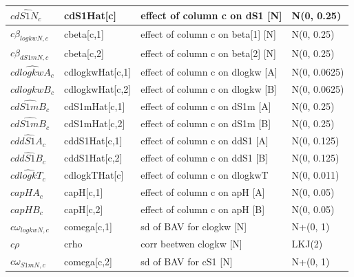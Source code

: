 \documentclass[
]{article}
\begin{document}
\begin{longtable*}[t]{l|l|>{\raggedright\arraybackslash}p{5cm}|l}
\hline
\hspace{1em}$\widehat{cdS1N_c}$ & cdS1Hat[c] & effect of column c on dS1 [N] & N(0, 0.25)\\
\hline
\hspace{1em}$c\beta_{logkwN,c}$ & cbeta[c,1] & effect of column c on beta[1] [N] & N(0, 0.25)\\
\hline
\hspace{1em}$c\beta_{dS1mN,c}$ & cbeta[c,2] & effect of column c on beta[2] [N] & N(0, 0.25)\\
\hline
\hspace{1em}$\widehat{cdlogkwA_{c}}$ & cdlogkwHat[c,1] & effect of column c on dlogkw [A] & N(0, 0.0625)\\
\hline
\hspace{1em}$\widehat{cdlogkwB_{c}}$ & cdlogkwHat[c,2] & effect of column c on dlogkw [B] & N(0, 0.0625)\\
\hline
\hspace{1em}$\widehat{cdS1mB_{c}}$ & cdS1mHat[c,1] & effect of column c on dS1m [A] & N(0, 0.25)\\
\hline
\hspace{1em}$\widehat{cdS1mB_{c}}$ & cdS1mHat[c,2] & effect of column c on dS1m [B] & N(0, 0.25)\\
\hline
\hspace{1em}$\widehat{cddS1A_{c}}$ & cddS1Hat[c,1] & effect of column c on ddS1 [A] & N(0, 0.125)\\
\hline
\hspace{1em}$\widehat{cddS1B_{c}}$ & cddS1Hat[c,2] & effect of column c on ddS1 [B] & N(0, 0.125)\\
\hline
\hspace{1em}$\widehat{cdlogkT_c}$ & cdlogkTHat[c] & effect of column c on dlogkwT & N(0, 0.011)\\
\hline
\hspace{1em}$capHA_{c}$ & capH[c,1] & effect of column c on apH [A] & N(0, 0.05)\\
\hline
\hspace{1em}$capHB_{c}$ & capH[c,2] & effect of column c on apH [B] & N(0, 0.05)\\
\hline
\hspace{1em}$c\omega_{logkwN,c}$ & comega[c,1] & sd of BAV for clogkw [N] & N+(0, 1)\\
\hline
\hspace{1em}$c\rho$ & crho & corr beetwen clogkw [N] & LKJ(2)\\
\hline
\hspace{1em}$c\omega_{S1mN,c}$ & comega[c,2] & sd of BAV for cS1 [N] & N+(0, 1)\\

\end{longtable*}
\end{document}
